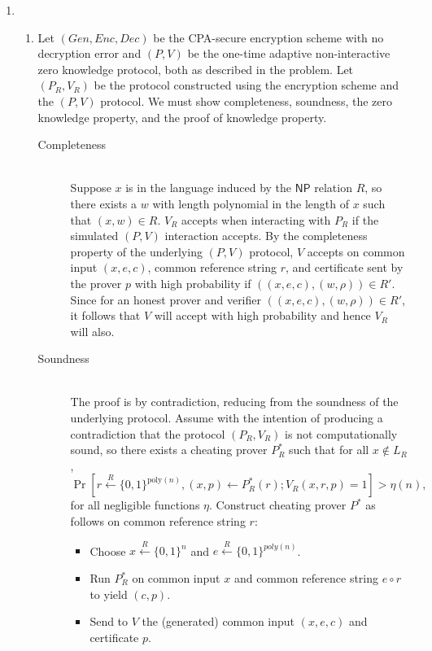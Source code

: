 \documentclass[draft]{article}
\newcommand{\class}[1]{{\ensuremath{\mathsf{#1}}}}
\newcommand{\NP}{\class{NP}}
\newcommand{\poly}{\textrm{poly}}
\newcommand{\getr}{\overset{R}{\gets}}
\newcommand{\getrsingle}{\getr\{0, 1\}}
\newcommand{\getrn}{\getrsingle^n}
\newcommand{\getrpoly}{\getrsingle^{poly(n)}}
\begin{document}
\begin{enumerate}
\item
  \begin{enumerate}
  \item
    Let $(Gen, Enc, Dec)$ be the CPA-secure encryption scheme with no decryption error and $(P, V)$ be the one-time adaptive non-interactive zero knowledge protocol, both as described in the problem.
    Let $(P_R, V_R)$ be the protocol constructed using the encryption scheme and the $(P, V)$ protocol.
    We must show completeness, soundness, the zero knowledge property, and the proof of knowledge property.
    \begin{description}
    \item[Completeness] \hfill \\
      Suppose $x$ is in the language induced by the $\NP$ relation $R$, so there exists a $w$ with length polynomial in the length of $x$ such that $(x,w)\in R$.
      $V_R$ accepts when interacting with $P_R$ if the simulated $(P, V)$ interaction accepts.
      By the completeness property of the underlying $(P, V)$ protocol, $V$ accepts on common input $(x, e, c)$, common reference string $r$, and certificate sent by the prover $p$ with high probability if $((x, e, c), (w, \rho))\in R'$.
      Since for an honest prover and verifier $((x, e, c), (w, \rho))\in R'$, it follows that $V$ will accept with high probability and hence $V_R$ will also.
    \item[Soundness] \hfill \\
      The proof is by contradiction, reducing from the soundness of the underlying protocol.
      Assume with the intention of producing a contradiction that the protocol $(P_R, V_R)$ is not computationally sound, so there exists a cheating prover $P^*_R$ such that for all $x\notin L_R$,
      \begin{displaymath}
        \Pr\left[r\getr\{0,1\}^{\poly(n)}, (x, p)\gets P^*_R(r); V_R(x, r, p)=1\right]>\eta(n),
      \end{displaymath}
      for all negligible functions $\eta$.
      Construct cheating prover $P^*$ as follows on common reference string $r$:
      \begin{itemize}
      \item Choose $x\getrn$ and $e\getrpoly$.
      \item Run $P^*_R$ on common input $x$ and common reference string $e\circ r$ to yield $(c, p)$.
      \item Send to $V$ the (generated) common input $(x, e, c)$ and certificate $p$.
      \end{itemize}


\end{description}
\end{enumerate}
\end{enumerate}
\end{document}
